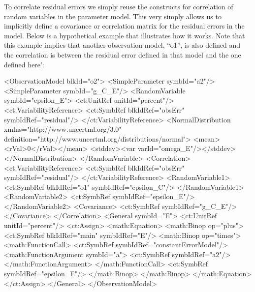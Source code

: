 \documentclass[a4paper,10pt]{article}
\begin{document}
To correlate residual errors we simply reuse the constructs for
correlation of random variables in the parameter model. This very
simply allows us to implicitly define a covariance or correlation matrix for
the residual errors in the model. Below is a hypothetical example that
illustrates how it works. Note that this example implies that another
observation model, ``o1'', is also defined and the correlation is
between the residual error defined in that model and the one defined here':
%
\begin{xmlcode}
       <ObservationModel blkId="o2">
            <SimpleParameter symbId="a2"/>
            <SimpleParameter symbId="g_C_E"/>
            <RandomVariable symbId="epsilon_E">
                <ct:UnitRef unitId="percent"/>
                <ct:VariabilityReference>
                    <ct:SymbRef blkIdRef="obsErr" symbIdRef="residual"/>
                </ct:VariabilityReference>
                <NormalDistribution xmlns="http://www.uncertml.org/3.0"
                    definition="http://www.uncertml.org/distributions/normal">
                    <mean><rVal>0</rVal></mean>
                    <stddev><var varId="omega_E"/></stddev>
                </NormalDistribution>
            </RandomVariable>
            <Correlation>
                <ct:VariabilityReference>
                    <ct:SymbRef blkIdRef="obsErr" symbIdRef="residual"/>
                </ct:VariabilityReference>
                <RandomVariable1>
                    <ct:SymbRef blkIdRef="o1" symbIdRef="epsilon_C"/>
                </RandomVariable1>
                <RandomVariable2>
                    <ct:SymbRef symbIdRef="epsilon_E"/>
                </RandomVariable2>
                <Covariance>
                    <ct:SymbRef symbIdRef="g_C_E"/>
                </Covariance>
            </Correlation>
            <General symbId="E">
                <ct:UnitRef unitId="percent"/>
                <ct:Assign>
                    <math:Equation>
                        <math:Binop op="plus">
                            <ct:SymbRef blkIdRef="main" symbIdRef="E"/>
                            <math:Binop op="times">
                                <math:FunctionCall>
                                    <ct:SymbRef symbIdRef="constantErrorModel"/>
                                    <math:FunctionArgument symbId="a">
                                        <ct:SymbRef symbIdRef="a2"/>
                                    </math:FunctionArgument>
                                </math:FunctionCall>
                                <ct:SymbRef symbIdRef="epsilon_E"/>
                            </math:Binop>
                        </math:Binop>
                    </math:Equation>
                </ct:Assign>
            </General>
        </ObservationModel>
\end{xmlcode}
\end{document}
